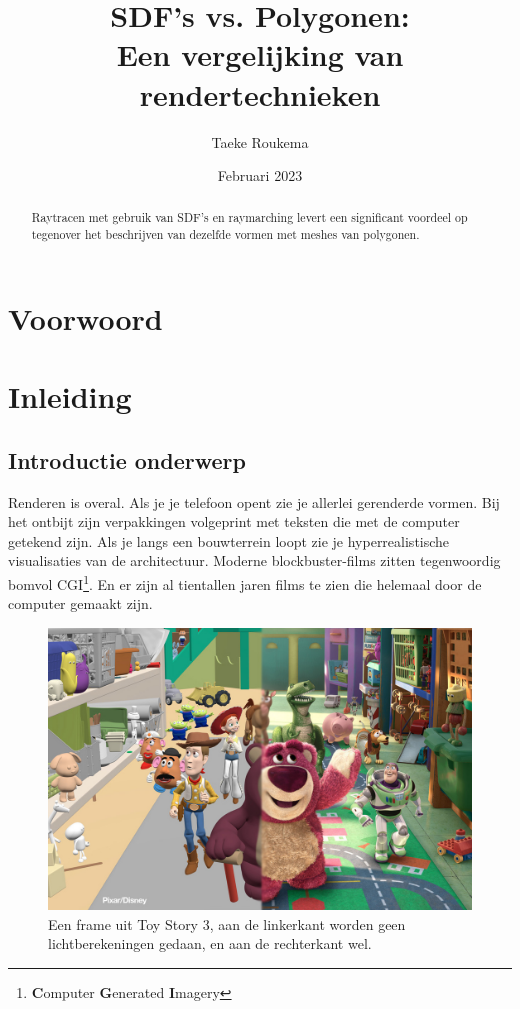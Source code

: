 \documentclass[12pt, a4paper]{article}
\title{\Huge SDF's vs. Polygonen:\\ \large Een vergelijking van rendertechnieken}
\author{Taeke Roukema}
\date{Februari 2023}
\begin{document}
\maketitle
\begin{abstract}
Raytracen met gebruik van SDF's en raymarching levert een significant voordeel op tegenover het beschrijven van dezelfde vormen met meshes van polygonen.
\end{abstract}
\clearpage
\tableofcontents{}
\clearpage
\section{Voorwoord}
\clearpage
\section{Inleiding}
\subsection{Introductie onderwerp}

Renderen is overal. Als je je telefoon opent zie je allerlei gerenderde vormen. Bij het ontbijt zijn verpakkingen volgeprint met teksten die met de computer getekend zijn. Als je langs een bouwterrein loopt zie je hyperrealistische visualisaties van de architectuur. Moderne blockbuster-films zitten tegenwoordig bomvol CGI\footnote{\textbf{C}omputer \textbf{G}enerated \textbf{I}magery}. En er zijn al tientallen jaren films te zien die helemaal door de computer gemaakt zijn. 

\begin{figure}
    \includegraphics[width=1\linewidth]{toystory3comparison.jpg}
    \caption{Een frame uit Toy Story 3, aan de linkerkant worden geen lichtberekeningen gedaan, en aan de rechterkant wel.}
    \label{fig:toystory3}
\end{figure}
\end{document}
